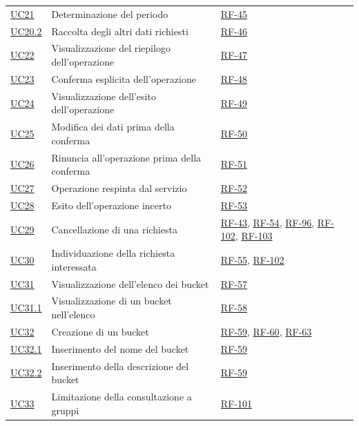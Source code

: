 \documentclass[documento]{gpt}
\begin{document}
{\begin{longtable}{@{}p{1.4cm}>{\raggedright\arraybackslash}p{9.2cm}>{\raggedright\arraybackslash}p{4.2cm}@{}}
\hyperref[uc:periodo]{UC21} & Determinazione del periodo & \hyperlink{req:RF-45}{RF-45} \\
\hyperref[uc:reg_campi]{UC20.2} & Raccolta degli altri dati richiesti & \hyperlink{req:RF-46}{RF-46} \\
\hyperref[uc:op_riep]{UC22} & Visualizzazione del riepilogo dell'operazione & \hyperlink{req:RF-47}{RF-47} \\
\hyperref[uc:op_conf]{UC23} & Conferma esplicita dell'operazione & \hyperlink{req:RF-48}{RF-48} \\
\hyperref[uc:op_esito]{UC24} & Visualizzazione dell'esito dell'operazione & \hyperlink{req:RF-49}{RF-49} \\
\hyperref[uc:op_modifica]{UC25} & Modifica dei dati prima della conferma & \hyperlink{req:RF-50}{RF-50} \\
\hyperref[uc:op_rinuncia]{UC26} & Rinuncia all'operazione prima della conferma & \hyperlink{req:RF-51}{RF-51} \\
\hyperref[uc:op_rifiuto]{UC27} & Operazione respinta dal servizio & \hyperlink{req:RF-52}{RF-52} \\
\hyperref[uc:op_incerto]{UC28} & Esito dell'operazione incerto & \hyperlink{req:RF-53}{RF-53} \\
\hyperref[uc:annulla_inv]{UC29} & Cancellazione di una richiesta & \hyperlink{req:RF-43}{RF-43}, \hyperlink{req:RF-54}{RF-54}, \hyperlink{req:RF-96}{RF-96}, \hyperlink{req:RF-102}{RF-102}, \hyperlink{req:RF-103}{RF-103} \\
\hyperref[uc:sel_rich]{UC30} & Individuazione della richiesta interessata & \hyperlink{req:RF-55}{RF-55}, \hyperlink{req:RF-102}{RF-102} \\
\hyperref[uc:bk_elenco]{UC31} & Visualizzazione dell'elenco dei bucket & \hyperlink{req:RF-57}{RF-57} \\
\hyperref[uc:bk_elem]{UC31.1} & Visualizzazione di un bucket nell'elenco & \hyperlink{req:RF-58}{RF-58} \\
\hyperref[uc:bk_crea]{UC32} & Creazione di un bucket & \hyperlink{req:RF-59}{RF-59}, \hyperlink{req:RF-60}{RF-60}, \hyperlink{req:RF-63}{RF-63} \\
\hyperref[uc:bk_nome]{UC32.1} & Inserimento del nome del bucket & \hyperlink{req:RF-59}{RF-59} \\
\hyperref[uc:bk_desc]{UC32.2} & Inserimento della descrizione del bucket & \hyperlink{req:RF-59}{RF-59} \\
\hyperref[uc:bk_dest]{UC33} & Limitazione della consultazione a gruppi & \hyperlink{req:RF-101}{RF-101} \\

\end{longtable}}
\end{document}
